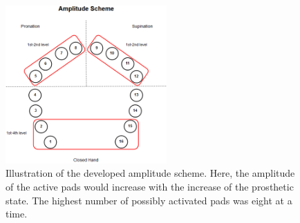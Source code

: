 \begin{figure}[H]                 
	\includegraphics[width=0.55\textwidth]{figures/El_array_amplitude}  
	\caption{Illustration of the developed amplitude scheme. Here, the amplitude of the active pads would increase with the increase of the prosthetic state. The highest number of possibly activated pads was eight at a time.}
	\label{fig:amplitude} 
\end{figure}






